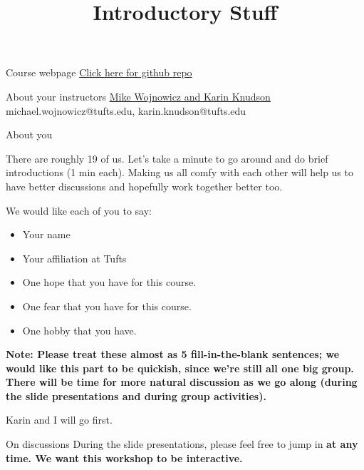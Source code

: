 \documentclass[10pt]{beamer}
\title{Introductory Stuff}
\begin{document}
\maketitle


\begin{frame}{Course webpage}
\href{https://github.com/mikewojnowicz/stat_ml_anomaly/}{Click here for github repo}
\end{frame}

\begin{frame}{About your instructors}
\href{https://disc.tufts.edu/people}{Mike Wojnowicz and Karin Knudson}
\vfill
michael.wojnowicz@tufts.edu, karin.knudson@tufts.edu
\end{frame}
 
\begin{frame}{About you}

There are roughly 19 of us.  Let's take a minute to go around and do brief introductions (1 min each).  Making us all comfy with each other will help us to  have better discussions and hopefully work together better too.

\vfill

We would like each of you to say: 
\begin{itemize}
\item Your name
\item Your affiliation at Tufts
\item One hope that you have for this course.
\item One fear that you have for this course.
\item One hobby that you have.
\end{itemize}

\bf{Note:} Please treat these almost as 5 fill-in-the-blank sentences; we would like this part to be quickish, since we're still all one big group.   There will be time for more natural discussion as we go along (during the slide presentations and during group activities). 
\vfill

Karin and I will go first.
 
\end{frame}

\begin{frame}{On discussions}
During the slide presentations, please feel free to jump in \bf{at any time}.  We want this workshop to be interactive. 
\end{frame}
\end{document}
